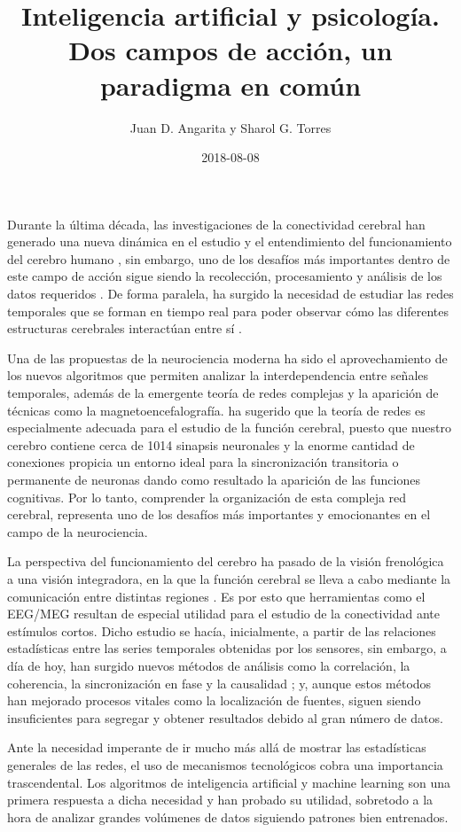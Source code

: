 \documentclass[jou]{apa6}
\title{Inteligencia artificial y psicología. Dos campos de acción, un paradigma en común}
\author{Juan D. Angarita y Sharol G. Torres}
\affiliation{Universidad Popular del Cesar}
\date{2018-08-08}
\begin{document}
\maketitle
Durante la última década, las investigaciones de la conectividad cerebral han generado una nueva dinámica en el estudio
y el entendimiento del funcionamiento del cerebro humano \parencite{Wen2005}, sin embargo, uno de los desafíos más
importantes dentro de este campo de acción sigue siendo la recolección, procesamiento y análisis de los datos 
requeridos \parencite{doi:10.1146/annurev.psych.56.091103.070311}. De forma paralela, ha surgido la necesidad 
de estudiar las redes temporales que se forman en tiempo real para poder observar cómo las diferentes estructuras 
cerebrales interactúan entre sí \parencite{Swanson2003}.

Una de las propuestas de la neurociencia moderna ha sido el aprovechamiento de los nuevos algoritmos que 
permiten analizar la interdependencia entre señales temporales, además de la emergente teoría de redes complejas 
y la aparición de técnicas como la magnetoencefalografía. \textcite{Sporns2010} ha sugerido 
que la teoría de redes es especialmente adecuada para el estudio de la función cerebral, puesto que nuestro 
cerebro contiene cerca de 1014 sinapsis neuronales y la enorme cantidad de conexiones propicia un entorno ideal 
para la sincronización transitoria o permanente de neuronas dando como resultado la aparición de las funciones 
cognitivas. Por lo tanto, comprender la organización de esta compleja red cerebral, representa 
uno de los desafíos más importantes y emocionantes en el campo de la neurociencia.

La perspectiva del funcionamiento del cerebro ha pasado de la visión frenológica a una visión integradora, 
en la que la función cerebral se lleva a cabo mediante la comunicación entre distintas regiones \parencite{Tononi5033}. 
Es por esto que herramientas como el EEG/MEG resultan de especial utilidad para el estudio de la conectividad
ante estímulos cortos. Dicho estudio se hacía, inicialmente, a partir de las relaciones estadísticas entre las 
series temporales obtenidas por los sensores, sin embargo, a día de hoy, han surgido nuevos métodos de 
análisis como la correlación, la coherencia, la sincronización en fase y la causalidad \parencite{Jirsa2007}; 
y, aunque estos métodos han mejorado procesos vitales como la localización de fuentes, siguen siendo insuficientes 
para segregar y obtener resultados debido al gran número de datos.

Ante la necesidad imperante de ir mucho más allá de mostrar las estadísticas generales de las redes, 
el uso de mecanismos tecnológicos cobra una importancia trascendental. Los algoritmos de inteligencia artificial 
y machine learning son una primera respuesta a dicha necesidad y han probado su utilidad, sobretodo a la hora de 
analizar grandes volúmenes de datos siguiendo patrones bien entrenados.
\end{document}

